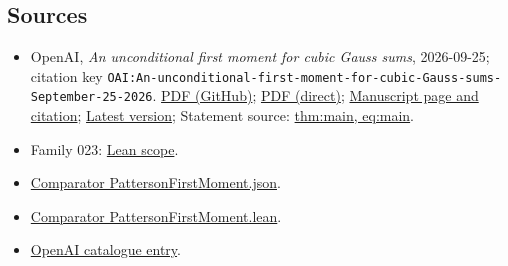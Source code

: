 \documentclass[11pt]{article}
\begin{document}
\subsection{Sources}
\begin{itemize}
\item OpenAI, \emph{An unconditional first moment for cubic Gauss sums}, 2026-09-25; citation key \texttt{OAI:An-unconditional-first-moment-for-cubic-Gauss-sums-September-25-2026}. \href{https://github.com/openai/math/blob/adc7f1241b42e322a6451854ab7e4b4c146bf78a/preprints/An-unconditional-first-moment-for-cubic-Gauss-sums-September-25-2026/paper.pdf}{PDF (GitHub)}; \href{https://github.com/openai/math/raw/adc7f1241b42e322a6451854ab7e4b4c146bf78a/preprints/An-unconditional-first-moment-for-cubic-Gauss-sums-September-25-2026/paper.pdf}{PDF (direct)}; \href{https://github.com/openai/math/blob/adc7f1241b42e322a6451854ab7e4b4c146bf78a/preprints/An-unconditional-first-moment-for-cubic-Gauss-sums-September-25-2026/README.md}{Manuscript page and citation}; \href{https://github.com/openai/math/blob/main/preprints/An-unconditional-first-moment-for-cubic-Gauss-sums-September-25-2026/paper.pdf}{Latest version}; Statement source: \href{https://github.com/openai/math/blob/adc7f1241b42e322a6451854ab7e4b4c146bf78a/preprints/An-unconditional-first-moment-for-cubic-Gauss-sums-September-25-2026/build/paper.tex\#L64}{thm:main, eq:main}.
\item Family 023: \href{https://github.com/openai/math/blob/adc7f1241b42e322a6451854ab7e4b4c146bf78a/lean/docs/023.md}{Lean scope}.
\item \href{https://github.com/openai/math/blob/adc7f1241b42e322a6451854ab7e4b4c146bf78a/lean/ComparatorChallenges/PattersonFirstMoment.json}{Comparator PattersonFirstMoment.json}.
\item \href{https://github.com/openai/math/blob/adc7f1241b42e322a6451854ab7e4b4c146bf78a/lean/ComparatorChallenges/PattersonFirstMoment.lean}{Comparator PattersonFirstMoment.lean}.
\item \href{https://github.com/openai/math/blob/adc7f1241b42e322a6451854ab7e4b4c146bf78a/CONTENTS.md}{OpenAI catalogue entry}.
\end{itemize}
\end{document}
